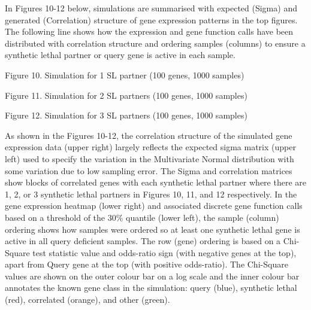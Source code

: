In Figures 10-12 below, simulations are summarised with expected (Sigma) and generated (Correlation) structure of gene expression patterns in the top figures.  The following line shows how the expression and gene function calls have been distributed with correlation structure and ordering samples (columns) to ensure a synthetic lethal partner or query gene is active in each sample.

Figure 10.  Simulation for 1 SL partner (100 genes, 1000 samples)

Figure 11.  Simulation for 2 SL partners (100 genes, 1000 samples)

Figure 12.  Simulation for 3 SL partners (100 genes, 1000 samples)

As shown in the Figures 10-12, the correlation structure of the simulated gene expression data (upper right) largely reflects the expected sigma matrix (upper left) used to specify the variation in the Multivariate Normal distribution with some variation due to low sampling error.  The Sigma and correlation matrices show blocks of correlated genes with each synthetic lethal partner where there are 1, 2, or 3 synthetic lethal partners in Figures 10, 11, and 12 respectively.  In the gene expression heatmap (lower right) and associated discrete gene function calls based on a threshold of the 30\% quantile (lower left), the sample (column) ordering shows how samples were ordered so at least one synthetic lethal gene is active in all query deficient samples.  The row (gene) ordering is based on a Chi-Square test statistic value and odds-ratio sign (with negative genes at the top), apart from Query gene at the top (with positive odds-ratio).  The Chi-Square values are shown on the outer colour bar on a log scale and the inner colour bar annotates the known gene class in the simulation: query (blue), synthetic lethal (red), correlated (orange), and other (green).

